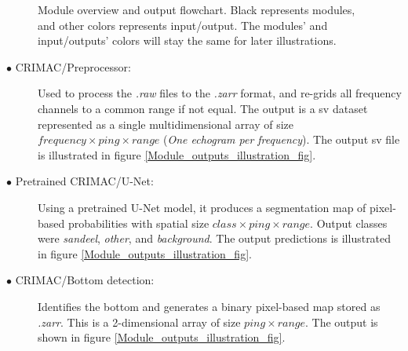                               \begin{figure}[H]
                \centering
                
                \caption[Module overview]{Module overview and output flowchart. Black represents modules, and other colors represents input/output. The modules' and input/outputs' colors will stay the same for later illustrations.}
              	\medskip 
                \label{Module_overview_fig}
            \end{figure} 
            \begin{description}
            
              \item[$\bullet$ CRIMAC/Preprocessor:] Used to process the \textit{.raw} files to the \textit{.zarr} format, and re-grids all frequency channels to a common range if not equal. The output is a \gls{sv} dataset represented as a single multidimensional array of size $frequency \times ping \times range$ (\textit{One echogram per frequency}). The output \gls{sv} file is illustrated in figure \ref{Module_outputs_illustration_fig}.%
                
              \item[$\bullet$ Pretrained CRIMAC/U-Net:] Using a pretrained U-Net model, it produces a segmentation map of pixel-based probabilities with spatial size $class \times ping \times range$. Output classes were \textit{sandeel}, \textit{other}, and \textit{background}. The output predictions is illustrated in figure \ref{Module_outputs_illustration_fig}.
              
              
              \item[$\bullet$ CRIMAC/Bottom detection:] Identifies the bottom and generates a binary pixel-based map stored as \textit{.zarr}. This is a 2-dimensional array of size $ping \times range$. The output is shown in figure \ref{Module_outputs_illustration_fig}.

            \end{description}
        

